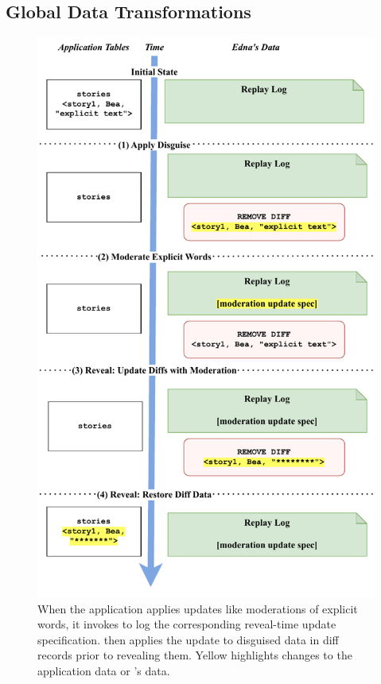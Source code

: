 %
\subsection{Global Data Transformations}
\label{s:design:dataupdates}

\begin{figure}
    \centering
    \includegraphics[width=.8\textwidth]{figs/update-moderation}
    \caption[During reveal, \sys applies reveal-time update specifications for
    global moderation updates.]{When the application applies updates like moderations of explicit
    words, it invokes \sys to log the corresponding reveal-time update specification. \sys then applies the
    update to disguised data in diff records prior to revealing them. Yellow 
    highlights changes to the application data or \sys's data.}
\label{f:update:mod}
\end{figure}
    
